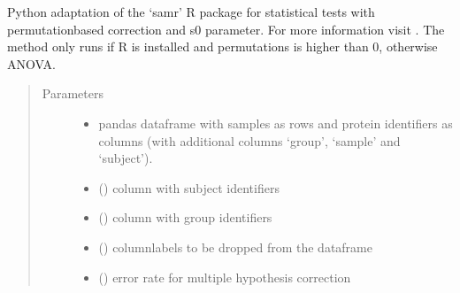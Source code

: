 \documentclass[letterpaper,10pt,english]{sphinxmanual}
\begin{document}
\begin{fulllineitems}
\label{\detokenize{_autosummary/analytics_core.analytics:analytics_core.analytics.analytics.run_samr}}
Python adaptation of the ‘samr’ R package for statistical tests with permutation\sphinxhyphen{}based correction and s0 parameter.
For more information visit .
The method only runs if R is installed and permutations is higher than 0, otherwise ANOVA.
\begin{quote}\begin{description}
\item[{Parameters}] \leavevmode\begin{itemize}
\item {} 
 \textendash{} pandas dataframe with samples as rows and protein identifiers as columns (with additional columns ‘group’, ‘sample’ and ‘subject’).

\item {} 
 () \textendash{} column with subject identifiers

\item {} 
 () \textendash{} column with group identifiers

\item {} 
 () \textendash{} columnlabels to be dropped from the dataframe

\item {} 
 () \textendash{} error rate for multiple hypothesis correction


\end{itemize}
\end{description}
\end{quote}
\end{fulllineitems}
\end{document}
